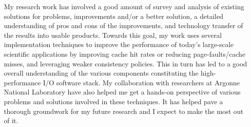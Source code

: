 \documentclass{article}
\begin{document}
My research work has involved a good amount of survey and 
analysis of existing solutions for problems, improvements and/or a better 
solution, a detailed understanding of pros and cons of the improvements, and 
technology transfer of the results into usable products. Towards this goal, 
my work uses several implementation techniques to improve the 
performance of today's large-scale scientific applications by improving cache 
hit rates or reducing page-faults/cache misses, and leveraging weaker
consistency policies. This in turn has led to a good overall understanding
of the various components constituting the high-performance I/O software
stack. My collaboration with researchers at Argonne 
National Laboratory have also helped me get a hands-on perspective of various problems
and solutions involved in these techniques. It has helped pave a thorough 
groundwork for my future research and I expect to make the most out of it.
\end{document}
